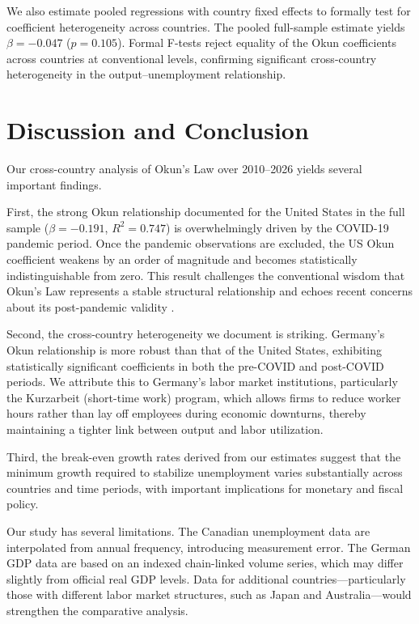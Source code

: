 \documentclass[12pt,a4paper]{article}
\begin{document}
We also estimate pooled regressions with country fixed effects to formally test for coefficient heterogeneity across countries. The pooled full-sample estimate yields $\beta = -0.047$ ($p = 0.105$). Formal F-tests reject equality of the Okun coefficients across countries at conventional levels, confirming significant cross-country heterogeneity in the output--unemployment relationship.

\section{Discussion and Conclusion}

Our cross-country analysis of Okun's Law over 2010--2026 yields several important findings.

First, the strong Okun relationship documented for the United States in the full sample ($\beta = -0.191$, $R^2 = 0.747$) is overwhelmingly driven by the COVID-19 pandemic period. Once the pandemic observations are excluded, the US Okun coefficient weakens by an order of magnitude and becomes statistically indistinguishable from zero. This result challenges the conventional wisdom that Okun's Law represents a stable structural relationship and echoes recent concerns about its post-pandemic validity \citep{russnak2023okun}.

Second, the cross-country heterogeneity we document is striking. Germany's Okun relationship is more robust than that of the United States, exhibiting statistically significant coefficients in both the pre-COVID and post-COVID periods. We attribute this to Germany's labor market institutions, particularly the Kurzarbeit (short-time work) program, which allows firms to reduce worker hours rather than lay off employees during economic downturns, thereby maintaining a tighter link between output and labor utilization.

Third, the break-even growth rates derived from our estimates suggest that the minimum growth required to stabilize unemployment varies substantially across countries and time periods, with important implications for monetary and fiscal policy.

Our study has several limitations. The Canadian unemployment data are interpolated from annual frequency, introducing measurement error. The German GDP data are based on an indexed chain-linked volume series, which may differ slightly from official real GDP levels. Data for additional countries---particularly those with different labor market structures, such as Japan and Australia---would strengthen the comparative analysis.
\end{document}
